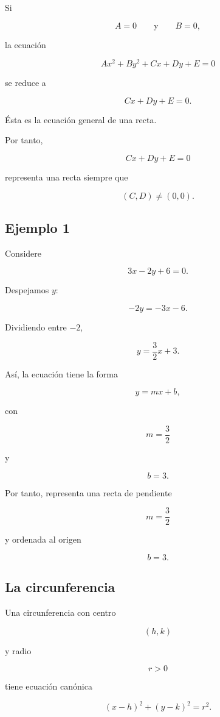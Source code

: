 \documentclass[12pt]{article}
\begin{document}
Si

\[
A=0
\qquad\text{y}\qquad
B=0,
\]

la ecuación

\[
Ax^2+By^2+Cx+Dy+E=0
\]

se reduce a

\[
Cx+Dy+E=0.
\]

Ésta es la ecuación general de una recta.

Por tanto,

\[
\boxed{
Cx+Dy+E=0
}
\]

representa una recta siempre que

\[
(C,D)\neq(0,0).
\]

\subsection*{Ejemplo 1}

Considere

\[
3x-2y+6=0.
\]

Despejamos \(y\):

\[
-2y=-3x-6.
\]

Dividiendo entre \(-2\),

\[
y=\frac32x+3.
\]

Así, la ecuación tiene la forma

\[
y=mx+b,
\]

con

\[
m=\frac32
\]

y

\[
b=3.
\]

Por tanto, representa una recta de pendiente

\[
\boxed{m=\frac32}
\]

y ordenada al origen

\[
\boxed{b=3}.
\]

\subsection{La circunferencia}

Una circunferencia con centro

\[
(h,k)
\]

y radio

\[
r>0
\]

tiene ecuación canónica

\[
\boxed{
(x-h)^2+(y-k)^2=r^2.
}
\]
\end{document}
